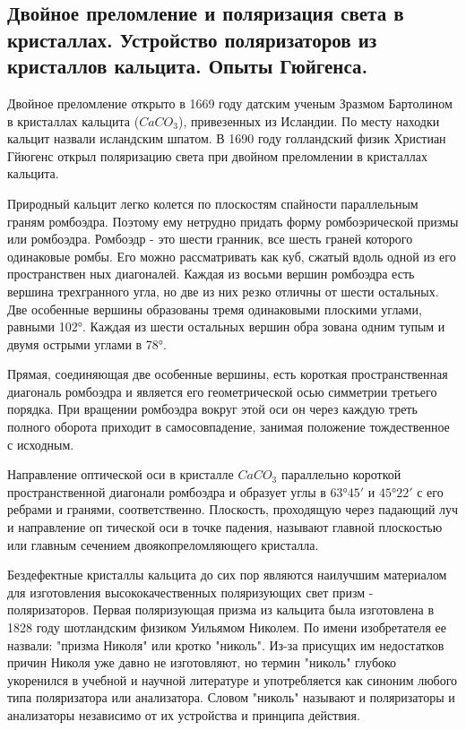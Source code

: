 \subsection{Двойное преломление и поляризация света в кристаллах. Устройство поляризаторов из кристаллов кальцита. Опыты Гюйгенса.}


Двойное преломление открыто в 1669 году датским ученым
Зразмом Бартолином в кристаллах кальцита ($CaCO_3$), привезенных из Исландии. По месту находки кальцит назвали исландским шпа­том. В 1690 году голландский физик Христиан Гйюгенс открыл
поляризацию света при двойном преломлении в кристаллах кальцита.

Природный кальцит легко колется по плоскостям спайности
параллельным граням ромбоэдра. Поэтому ему нетрудно придать
форму ромбоэрической призмы или ромбоэдра. Ромбоэдр - это шести­
гранник, все шесть граней которого одинаковые ромбы. Его можно
рассматривать как куб, сжатый вдоль одной из его пространствен­
ных диагоналей. Каждая из восьми вершин ромбоэдра есть вершина
трехгранного угла, но две из них резко отличны от шести остальных. Две особенные вершины образованы тремя одинаковыми плоскими углами, равными 102°. Каждая из шести остальных вершин обра­
зована одним тупым и двумя острыми углами в 78°.

Прямая, соединяющая две особенные вершины, есть короткая
пространственная диагональ ромбоэдра и является его геометрической осью симметрии третьего порядка. При вращении ромбоэдра
вокруг этой оси он через каждую треть полного оборота приходит
в самосовпадение, занимая положение тождественное с исходным.

Направление оптической оси в кристалле $CaCO_3$ параллельно короткой пространственной диагонали ромбоэдра и образует углы в $63°45'$ и $45°22'$ с его ребрами и гранями, соответственно.
Плоскость, проходящую через падающий луч и направление оп­
тической оси в точке падения, называют главной плоскостью или
главным сечением двоякопреломляющего кристалла.

Бездефектные кристаллы кальцита до сих пор являются наилучшим материалом для изготовления высококачественных поляризующих
свет призм - поляризаторов. Первая поляризующая призма из кальцита была изготовлена в 1828 году шотландским физиком Уильямом
Николем. По имени изобретателя ее назвали: "призма Николя" или
кротко "николь". Из-за присущих им недостатков причин Николя уже
давно не изготовляют, но термин "николь" глубоко укоренился в
учебной и научной литературе и употребляется как синоним любого
типа поляризатора или анализатора. Словом "николь" называют и
поляризаторы и анализаторы независимо от их устройства и прин­ципа действия.

